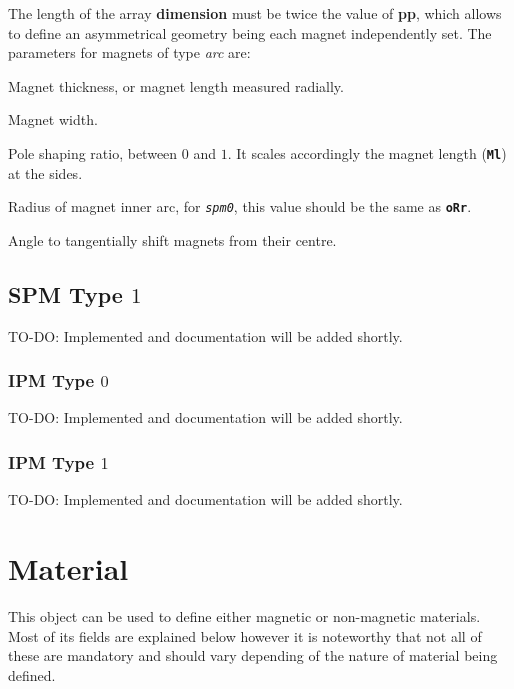 \documentclass[justified]{tufte-book} %
\begin{document}
The length of the array \textbf{dimension} must be twice the value of \textbf{pp}, which allows to define an asymmetrical geometry being each magnet independently set. The parameters for magnets of type \textit{arc} are:

\begin{description}[leftmargin=4.5cm, style=nextline]
\item[\normalfont{\ttfamily{\textbf{Ml}}: \textit{Float}}] Magnet thickness, or magnet length measured radially.
\item[\normalfont{\ttfamily{\textbf{Mw}}: \textit{Float}}] Magnet width.
\item[\normalfont{\ttfamily{\textbf{Mps}}: \textit{Float}}] Pole shaping ratio, between $0$ and $1$. It scales accordingly the magnet length (\texttt{\textbf{Ml}}) at the sides.
\item[\normalfont{\ttfamily{\textbf{iMr}}: \textit{Float}}] Radius of magnet inner arc, for \texttt{\textit{spm0}}, this value should be the same as  \texttt{\textbf{oRr}}.
\item[\normalfont{\ttfamily{\textbf{delta}}: \textit{Float}}] Angle to tangentially shift magnets from their centre.
\end{description}


\section[SPM Type 1]{SPM Type $1$}
TO-DO: Implemented and documentation will be added shortly.

\subsection[IPM Type 0]{IPM Type $0$}
TO-DO: Implemented and documentation will be added shortly.

\subsection[IPM Type 1]{IPM Type $1$}
TO-DO: Implemented and documentation will be added shortly.


\chapter{Material}\label{ch:material}
\begin{fullwidth}
This object can be used to define either magnetic or non-magnetic materials. Most of its fields are explained below however it is noteworthy that not all of these are mandatory and should vary depending of the nature of material being defined.
\end{fullwidth}
\end{document}

